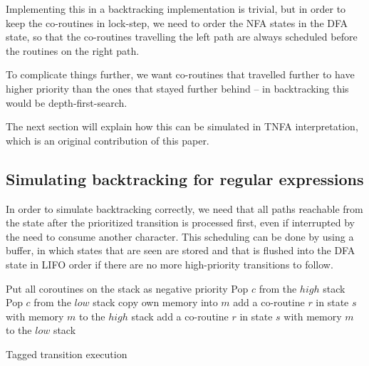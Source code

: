\documentclass[11pt,a4paper,twoside,openright]{Thesis}
\theoremstyle{definition}
\begin{document}
Implementing this in a backtracking implementation is trivial, but in order
to keep the co-routines in lock-step, we need to order the NFA states in the
DFA state, so that the co-routines travelling the left path are always
scheduled before the routines on the right path.

To complicate things further, we want co-routines that travelled further to 
have higher priority than the ones that stayed further behind -- in 
backtracking this would be depth-first-search.

The next section will explain how this can be simulated in TNFA interpretation,
which is an original contribution of this paper.

\subsection{Simulating backtracking for regular expressions}

In order to simulate backtracking correctly, we need that all paths reachable 
from the state after the prioritized transition is processed first, even if
interrupted by the need to consume another character. This scheduling can be
done by using a buffer, in which states that are seen are stored and that is
flushed into the DFA state in LIFO order if there are no more high-priority
transitions to follow.

\begin{algorithm*}
  \begin{algorithmic}
    \State Put all coroutines on the stack as negative priority
        \State Pop $c$ from the $high$ stack
      \Else
        \State Pop $c$ from the $low$ stack
      \EndIf
          \State copy own memory into $m$
          \State {}
        \EndIf
          \State add a co-routine $r$ in state $s$ with memory $m$ to the 
          $high$ stack
        \Else
          \State add a co-routine $r$ in state $s$ with memory $m$ to the 
          $low$ stack
        \EndIf
      \EndFor
    \EndWhile
  \EndFunction
  \end{algorithmic}
  \caption{\label{alg:coroutine-tagged}Tagged transition execution}
\end{algorithm*}
\end{document}
